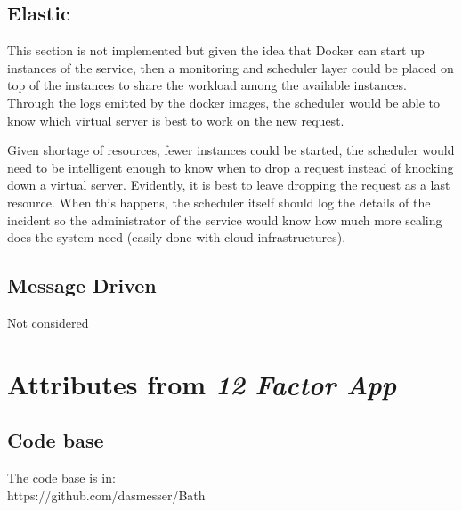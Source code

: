\documentclass[10pt]{article}
\begin{document}
 \subsection{Elastic} %
 
This section is not implemented but given the idea that Docker can start up instances of the service, then a monitoring and scheduler layer could be placed on top of the instances to share the workload among the available instances. Through the logs emitted by the docker images, the scheduler would be able to know which virtual server is best to work on the new  request.

Given shortage of resources, fewer instances could be started, the scheduler would need to be intelligent enough to know when to drop a request instead of knocking down a virtual server. Evidently, it is best to leave dropping the request as a last resource. When this happens, the scheduler itself should log the details of the incident so the administrator of the service would know how much more scaling does the system need (easily done with cloud infrastructures).
 
 \subsection{Message Driven}
 
 Not considered
 
\section{Attributes from {\em 12 Factor App}}
 \subsection{Code base}
 
The code base is in:\\

https://github.com/dasmesser/Bath\\
\end{document}
